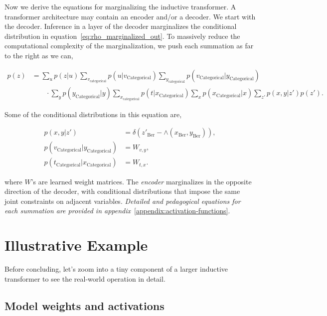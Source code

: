 \documentclass{article}
\begin{document}
Now we derive the equations for marginalizing the inductive transformer.  A transformer architecture may contain an encoder and/or a decoder.  We start with the decoder. Inference in a layer of the decoder marginalizes the conditional distribution in equation~\ref{eq:rho_marginalized_out}.  To massively reduce the computational complexity of the marginalization, we push each summation as far to the right as we can,

\begin{align}
p(z) &= \sum_u p(z|u)\sum_{v_\text{categorical}}p(u|v_{\text{Categorical}})\sum_{y_\text{categorical}}p(v_{\text{Categorical}}|y_{\text{Categorical}}) \nonumber \\ 
&\quad\quad \cdot \sum_y p(y_{\text{Categorical}}|y) \sum_{x_\text{categorical}} p(t|x_{\text{Categorical}})\sum_x p(x_{\text{Categorical}}|x) \sum_{z'}p(x, y|z')p(z').
\end{align}

Some of the conditional distributions in this equation are,

\begingroup
\addtolength{\jot}{1em}
\begin{align}
    p(x, y|z') &= \delta(z'_{\text{Ber}}-\land(x_{\text{Ber}}, y_{\text{Ber}})), \\
    p(v_{\text{Categorical}}|y_{\text{Categorical}}) &= W_{v,y}, \\
    p(t_{\text{Categorical}}|x_{\text{Categorical}}) &= W_{t,x}.
\end{align} 
\endgroup

where $W$'s are learned weight matrices. The \emph{encoder} marginalizes in the opposite direction of the decoder, with conditional distributions that impose the same joint constraints on adjacent variables.  \emph{Detailed and pedagogical equations for each summation are provided in appendix}~\ref{appendix:activation-functions}.


\section{Illustrative Example}

Before concluding, let's zoom into a tiny component of a larger inductive transformer to see the real-world operation in detail.

\subsection{Model weights and activations}
\end{document}
